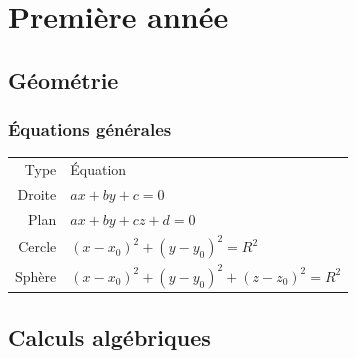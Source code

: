 \documentclass[11pt,a4paper]{report}
\theoremstyle{definition}
\begin{document}
\part{Première année}
\chapter{Géométrie} %
\label{cha:geometrie}
\section{Équations générales} %
\label{sec:equations_generales}
\begin{tabular}{r | l}
     Type       & Équation \\
     Droite     & $ax + by +c = 0$ \\
     Plan       & $ax + by +cz +d = 0$ \\
     Cercle     & $(x-x_0)^2 + (y-y_0)^2 = R^2$ \\
     Sphère     & $(x-x_0)^2 + (y-y_0)^2  + (z-z_0)^2 = R^2$
\end{tabular}


\chapter{Calculs algébriques} %
\label{cha:calculs_algebriques}
\end{document}
